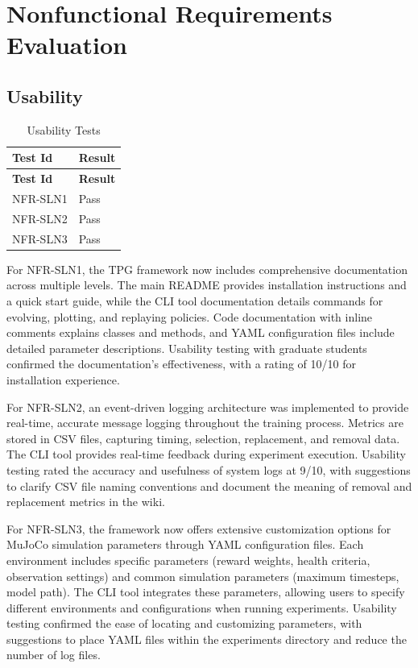 \documentclass[12pt, titlepage]{article}
\begin{document}
\section{Nonfunctional Requirements Evaluation}

\subsection{Usability}\label{usability}
\begin{center}
  \begin{longtable}{|p{4cm}|p{4cm}|}
  \caption{Usability Tests} \\
  \hline
  \textbf{Test Id} & \textbf{Result} \\
  \hline
  \endfirsthead
  \hline
  \textbf{Test Id} & \textbf{Result} \\
  \hline
  \endhead
  NFR-SLN1 & Pass \\
  \hline
  NFR-SLN2 & Pass \\
  \hline
  NFR-SLN3 & Pass \\
  \hline
  \end{longtable}
\end{center}

For NFR-SLN1, the TPG framework now includes comprehensive documentation across multiple levels. The main README provides installation instructions and a quick start guide, while the CLI tool documentation details commands for evolving, plotting, and replaying policies. Code documentation with inline comments explains classes and methods, and YAML configuration files include detailed parameter descriptions. Usability testing with graduate students confirmed the documentation's effectiveness, with a rating of 10/10 for installation experience.

For NFR-SLN2, an event-driven logging architecture was implemented to provide real-time, accurate message logging throughout the training process. Metrics are stored in CSV files, capturing timing, selection, replacement, and removal data. The CLI tool provides real-time feedback during experiment execution. Usability testing rated the accuracy and usefulness of system logs at 9/10, with suggestions to clarify CSV file naming conventions and document the meaning of removal and replacement metrics in the wiki.

For NFR-SLN3, the framework now offers extensive customization options for MuJoCo simulation parameters through YAML configuration files. Each environment includes specific parameters (reward weights, health criteria, observation settings) and common simulation parameters (maximum timesteps, model path). The CLI tool integrates these parameters, allowing users to specify different environments and configurations when running experiments. Usability testing confirmed the ease of locating and customizing parameters, with suggestions to place YAML files within the experiments directory and reduce the number of log files.
		
\end{document}
